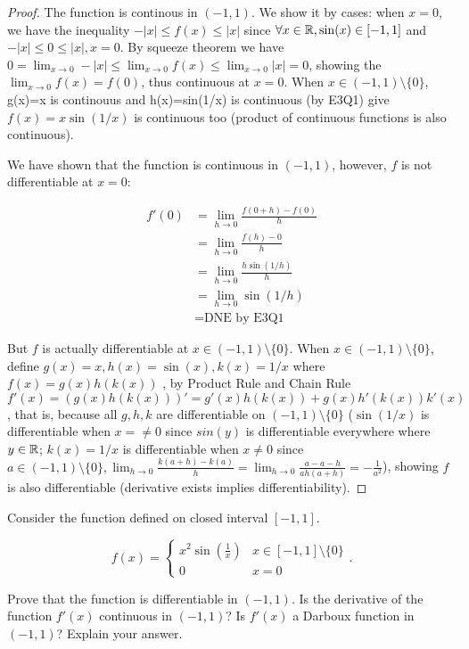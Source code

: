 \documentclass{homework}
\newcommand{\R}{\bb{R}} %
\newcommand{\ra}{\rightarrow}
\newcommand{\?}{\stackrel{?}{=}}
\theoremstyle{definition}
\begin{document}
\begin{proof}
    The function is continous in $(-1,1)$. We show it by cases: when $x=0$, we have the inequality $-|x|\leq f(x)\leq |x|$ since $\forall x\in\R, \sin(x)\in[-1,1]$ and $-|x|\leq0\leq |x|, x=0$. By squeeze theorem we have $0=\displaystyle\lim_{x\ra0}-|x|\leq\displaystyle\lim_{x\ra0}f(x)\leq\displaystyle\lim_{x\ra0}|x|=0$, showing the $\displaystyle\lim_{x\ra0}f(x)=f(0)$, thus continuous at $x=0$. When $x\in(-1,1)\setminus\{0\}$, g(x)=x is continouus and h(x)=sin(1/x) is continuous (by E3Q1) give $f(x)=x\sin(1/x)$ is continuous too (product of continuous functions is also continuous).

    We have shown that the function is continuous in $(-1,1)$, however, $f$ is not differentiable at $x=0$:

    \begin{align*}
        f'(0)&=\lim_{h\ra0}\frac{f(0+h)-f(0)}{h}\\
        &=\lim_{h\ra0}\frac{f(h)-0}{h}\\
        &=\lim_{h\ra0}\frac{h\sin(1/h)}{h}\\
        &=\lim_{h\ra0}\sin(1/h)\\
        &=\text{DNE by E3Q1}             
    \end{align*}

    But $f$ is actually differentiable at $x\in(-1,1)\setminus\{0\}$. When $x\in(-1,1)\setminus\{0\}$, define $g(x)=x, h(x)=\sin(x), k(x)=1/x$ where $f(x)=g(x)h(k(x))$ , by Product Rule and Chain Rule $f'(x)=(g(x)h(k(x)))'=g'(x)h(k(x))+g(x)h'(k(x))k'(x)$, that is, because all $g, h, k$ are differentiable on $(-1,1)\setminus\{0\}$ ($\sin(1/x)$ is differentiable when $x=\neq0$ since $sin(y)$ is differentiable everywhere where $y\in\R$; $k(x)=1/x$ is differentiable when $x\neq0$ since $a\in(-1,1)\setminus\{0\}, \lim_{h\to0}\frac{k(a+h)-k(a)}{h}=\lim_{h\to0}\frac{a - a - h}{ah(a+h)}=-\frac{1}{a^2}$), showing $f$ is also differentiable (derivative exists implies differentiability). 
\end{proof}


\question[3] Consider the function defined on closed interval $[-1,1]$.

\[f(x)=\begin{cases}
    x^2\sin(\frac1x) & x\in[-1,1]\setminus\{0\}\\
    0 & x=0
\end{cases}.\]

Prove that the function is differentiable in $(-1,1)$. Is the derivative of the function $f'(x)$ continuous in $(-1,1)$? Is $f'(x)$ a Darboux function in $(-1,1)$? Explain your answer. 
\end{document}
